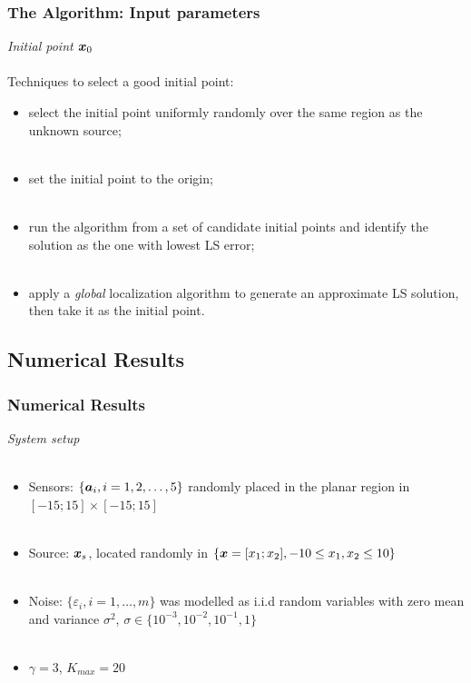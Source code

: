 \documentclass [t] {beamer} %
\begin{document}
\begin{frame} %
\frametitle{The Algorithm: Input parameters}
{\large \textit{Initial point $\mbox{\boldmath$x$}_0$}}
\\~\\
Techniques to select a good initial point:
\begin{itemize}
\item
select the initial point uniformly randomly over the same region as the unknown source; 
\\~\\
\item
set the initial point to the origin; \\~\\
\item
run the algorithm from a set of candidate initial points and identify the solution as the one with lowest LS error; %
\\~\\
\item
apply a \textit{global} localization algorithm  to generate an approximate LS solution, then take it as the initial point.%
\end{itemize}
\end{frame}


\subsection{Numerical Results}

\begin{frame} %
\frametitle{Numerical Results}
{\large \textit{System setup}}
\\~\\
\begin{itemize}
\item
Sensors: $\{\mbox{\boldmath$a$}_i, i = 1, 2,\ldots,5\}$ randomly placed in the planar region in $[-15;15]\times[-15;15]$
\\~\\
\item
Source: $\mbox{\boldmath$x$}_s$, located randomly in  $\{\mbox{\boldmath$x$}=[x_1;x_2], -10\leq x_1,x_2\leq 10\}$
\\~\\
\item
Noise: $\{\varepsilon_i, i=1,\ldots,m\}$ was modelled as i.i.d random variables with zero mean and variance $\sigma^2$,  $\sigma \in \{10^{-3}, 10^{-2}, 10^{-1}, 1\}$
\\~\\
\item
$\gamma  = 3$, $K_{max} = 20$
\end{itemize}
\end{frame}
\end{document}
